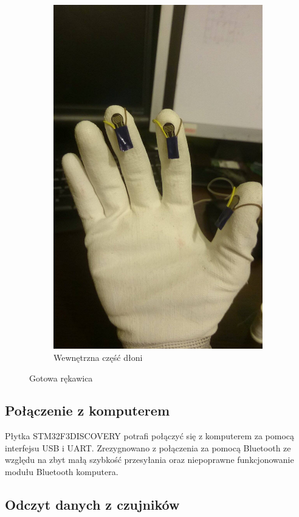 \documentclass[12pt,a4paper]{article}
\begin{document}
\begin{figure}[!htb]
\begin{subfigure}{.5\textwidth}
	\includegraphics[width=.9\textwidth]{images/gotowa2.jpg}
	\caption{Wewnętrzna część dłoni}
	\label{fig:gotowa2}
\end{subfigure}
\caption{Gotowa rękawica}
\label{fig:gotowa_rekawica}
\end{figure}

\subsection{Połączenie z komputerem}
Płytka STM32F3DISCOVERY potrafi połączyć się z komputerem za pomocą interfejsu USB i UART. Zrezygnowano z połączenia za pomocą Bluetooth ze względu na zbyt małą szybkość przesyłania oraz niepoprawne funkcjonowanie modułu Bluetooth komputera.

\subsection{Odczyt danych z czujników}
\end{document}

